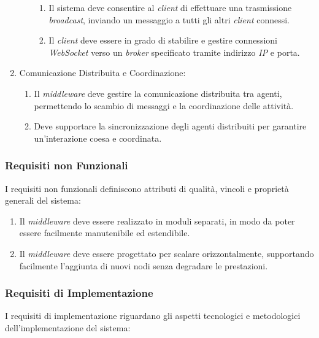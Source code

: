 \begin{enumerate}
\begin{enumerate}
\begin{enumerate}
                              \item Il sistema deve consentire al \textit{client} di effettuare una trasmissione \textit{broadcast}, inviando un messaggio a tutti gli altri \textit{client} connessi.
                              \item  Il \textit{client} deve essere in grado di stabilire e gestire connessioni \textit{WebSocket} verso un \textit{broker} specificato tramite indirizzo \textit{IP} e porta.
                        \end{enumerate}
            \end{enumerate}
      \item  Comunicazione Distribuita e Coordinazione:
            \begin{enumerate}
                  \item  Il \textit{middleware} deve gestire la comunicazione distribuita tra agenti, permettendo lo scambio di messaggi e la coordinazione delle attività.
                  \item Deve supportare la sincronizzazione degli agenti distribuiti per garantire un'interazione coesa e coordinata.
            \end{enumerate}
\end{enumerate}

\subsubsection{Requisiti non Funzionali}
I requisiti non funzionali definiscono attributi di qualità, vincoli e proprietà generali del sistema:

\begin{enumerate}
      \item Il \textit{middleware} deve essere realizzato in moduli separati, in modo da poter essere facilmente manutenibile ed estendibile.
      \item  Il \textit{middleware} deve essere progettato per scalare orizzontalmente, supportando facilmente l'aggiunta di nuovi nodi senza degradare le prestazioni.
\end{enumerate}

\subsubsection{Requisiti di Implementazione}
I requisiti di implementazione riguardano gli aspetti tecnologici e metodologici dell'implementazione del sistema:

